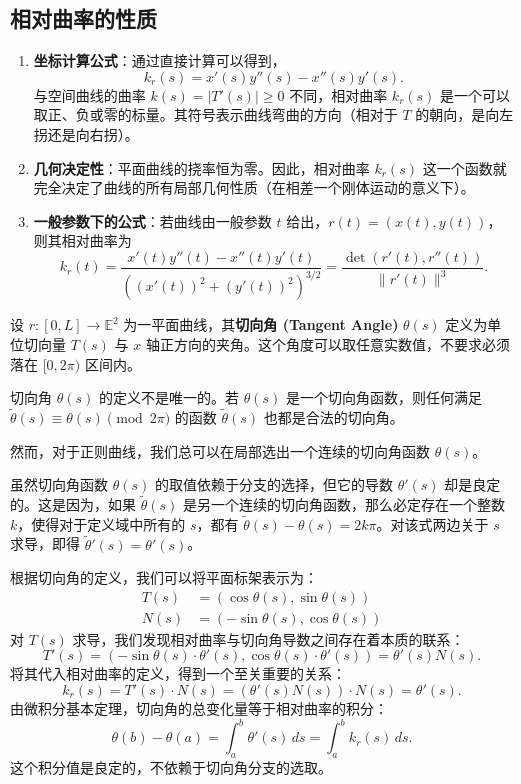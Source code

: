 \documentclass[lang=cn,10pt,thmcnt=section]{elegantbook}
\begin{document}
\subsection*{相对曲率的性质}
\begin{enumerate}
    \item \textbf{坐标计算公式}：通过直接计算可以得到，
    \[
    k_r(s) = x'(s) y''(s) - x''(s) y'(s).
    \]
    与空间曲线的曲率 $k(s) = |T'(s)| \ge 0$ 不同，相对曲率 $k_r(s)$ 是一个可以取正、负或零的标量。其符号表示曲线弯曲的方向（相对于 $T$ 的朝向，是向左拐还是向右拐）。

    \item \textbf{几何决定性}：平面曲线的挠率恒为零。因此，相对曲率 $k_r(s)$ 这一个函数就完全决定了曲线的所有局部几何性质（在相差一个刚体运动的意义下）。

    \item \textbf{一般参数下的公式}：若曲线由一般参数 $t$ 给出，$r(t) = (x(t), y(t))$，则其相对曲率为
    \[
    k_r(t) = \frac{x'(t) y''(t) - x''(t) y'(t)}{\left( (x'(t))^2 + (y'(t))^2 \right)^{3/2}} = \frac{\det(r'(t), r''(t))}{\|r'(t)\|^3}.
    \]
\end{enumerate}
\begin{definition}[切向角]
    设 $r: [0, L] \to \mathbb{E}^2$ 为一平面曲线，其\textbf{切向角 (Tangent Angle)} $\theta(s)$ 定义为单位切向量 $T(s)$ 与 $x$ 轴正方向的夹角。这个角度可以取任意实数值，不要求必须落在 $[0, 2\pi)$ 区间内。
\end{definition}

\begin{remark}
    切向角 $\theta(s)$ 的定义不是唯一的。若 $\theta(s)$ 是一个切向角函数，则任何满足 $\tilde{\theta}(s) \equiv \theta(s) \pmod{2\pi}$ 的函数 $\tilde{\theta}(s)$ 也都是合法的切向角。
    
    然而，对于正则曲线，我们总可以在局部选出一个连续的切向角函数 $\theta(s)$。
\end{remark}

虽然切向角函数 $\theta(s)$ 的取值依赖于分支的选择，但它的导数 $\theta'(s)$ 却是良定的。这是因为，如果 $\tilde{\theta}(s)$ 是另一个连续的切向角函数，那么必定存在一个整数 $k$，使得对于定义域中所有的 $s$，都有 $\tilde{\theta}(s) - \theta(s) = 2k\pi$。对该式两边关于 $s$ 求导，即得 $\tilde{\theta}'(s) = \theta'(s)$。

根据切向角的定义，我们可以将平面标架表示为：
\begin{align*}
    T(s) &= (\cos \theta(s), \sin \theta(s)) \\
    N(s) &= (-\sin \theta(s), \cos \theta(s))
\end{align*}
对 $T(s)$ 求导，我们发现相对曲率与切向角导数之间存在着本质的联系：
\[
T'(s) = (-\sin \theta(s) \cdot \theta'(s), \cos \theta(s) \cdot \theta'(s)) = \theta'(s) N(s).
\]
将其代入相对曲率的定义，得到一个至关重要的关系：
\[
k_r(s) = T'(s) \cdot N(s) = (\theta'(s)N(s)) \cdot N(s) = \theta'(s).
\]
由微积分基本定理，切向角的总变化量等于相对曲率的积分：
\[
\theta(b) - \theta(a) = \int_a^b \theta'(s) \, ds = \int_a^b k_r(s) \, ds.
\]
这个积分值是良定的，不依赖于切向角分支的选取。
\end{document}
